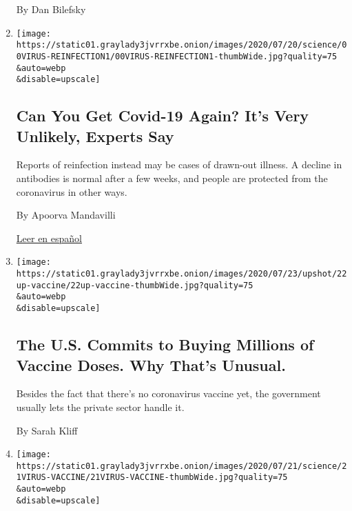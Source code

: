 \begin{enumerate}
  By Dan Bilefsky
\item
  \href{/2020/07/22/health/covid-antibodies-herd-immunity.html}{}

  \texttt{[image: https://static01.graylady3jvrrxbe.onion/images/2020/07/20/science/00VIRUS-REINFECTION1/00VIRUS-REINFECTION1-thumbWide.jpg?quality=75\\\&auto=webp\\\&disable=upscale]}

  \hypertarget{can-you-get-covid-19-again-its-very-unlikely-experts-say}{%
  \subsection{Can You Get Covid-19 Again? It's Very Unlikely, Experts
  Say}\label{can-you-get-covid-19-again-its-very-unlikely-experts-say}}

  Reports of reinfection instead may be cases of drawn-out illness. A
  decline in antibodies is normal after a few weeks, and people are
  protected from the coronavirus in other ways.

  By Apoorva Mandavilli

  \href{https://www.nytimes3xbfgragh.onion/es/2020/07/24/espanol/ciencia-y-tecnologia/reinfeccion-coronavirus.html}{Leer
  en español}
\item
  \href{/2020/07/22/upshot/vaccine-coronavirus-government-purchase.html}{}

  \texttt{[image: https://static01.graylady3jvrrxbe.onion/images/2020/07/23/upshot/22up-vaccine/22up-vaccine-thumbWide.jpg?quality=75\\\&auto=webp\\\&disable=upscale]}

  \hypertarget{the-us-commits-to-buying-millions-of-vaccine-doses-why-thats-unusual}{%
  \subsection{The U.S. Commits to Buying Millions of Vaccine Doses. Why
  That's
  Unusual.}\label{the-us-commits-to-buying-millions-of-vaccine-doses-why-thats-unusual}}

  Besides the fact that there's no coronavirus vaccine yet, the
  government usually lets the private sector handle it.

  By Sarah Kliff
\item
  \href{/2020/07/21/health/covid-19-vaccine-coronavirus-moderna-pfizer.html}{}

  \texttt{[image: https://static01.graylady3jvrrxbe.onion/images/2020/07/21/science/21VIRUS-VACCINE/21VIRUS-VACCINE-thumbWide.jpg?quality=75\\\&auto=webp\\\&disable=upscale]}


\end{enumerate}
